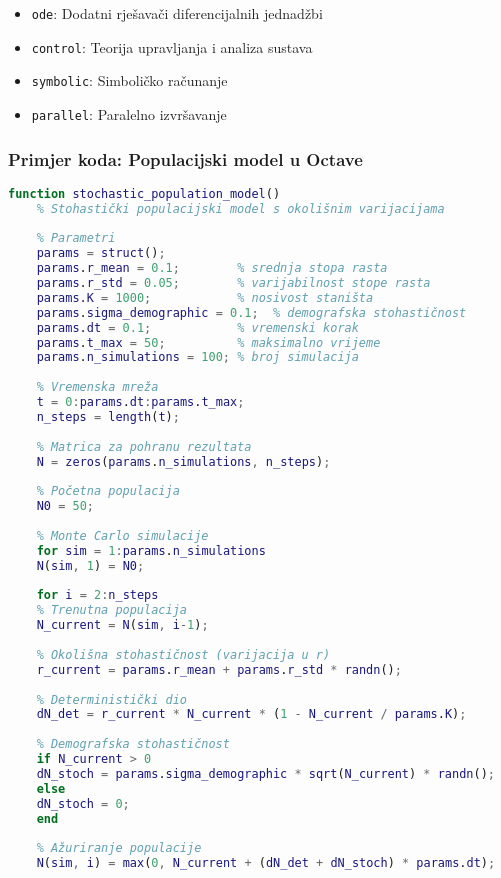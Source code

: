 \documentclass[11pt,oneside]{book}
\begin{document}
\begin{itemize}
	\item \texttt{ode}: Dodatni rješavači diferencijalnih jednadžbi
	\item \texttt{control}: Teorija upravljanja i analiza sustava
	\item \texttt{symbolic}: Simboličko računanje
	\item \texttt{parallel}: Paralelno izvršavanje
\end{itemize}

\subsubsection{Primjer koda: Populacijski model u Octave}

\begin{lstlisting}[language=Matlab, caption=Stohastički populacijski model u Octave]
	function stochastic_population_model()
	% Stohastički populacijski model s okolišnim varijacijama
	
	% Parametri
	params = struct();
	params.r_mean = 0.1;        % srednja stopa rasta
	params.r_std = 0.05;        % varijabilnost stope rasta
	params.K = 1000;            % nosivost staništa
	params.sigma_demographic = 0.1;  % demografska stohastičnost
	params.dt = 0.1;            % vremenski korak
	params.t_max = 50;          % maksimalno vrijeme
	params.n_simulations = 100; % broj simulacija
	
	% Vremenska mreža
	t = 0:params.dt:params.t_max;
	n_steps = length(t);
	
	% Matrica za pohranu rezultata
	N = zeros(params.n_simulations, n_steps);
	
	% Početna populacija
	N0 = 50;
	
	% Monte Carlo simulacije
	for sim = 1:params.n_simulations
	N(sim, 1) = N0;
	
	for i = 2:n_steps
	% Trenutna populacija
	N_current = N(sim, i-1);
	
	% Okolišna stohastičnost (varijacija u r)
	r_current = params.r_mean + params.r_std * randn();
	
	% Deterministički dio
	dN_det = r_current * N_current * (1 - N_current / params.K);
	
	% Demografska stohastičnost
	if N_current > 0
	dN_stoch = params.sigma_demographic * sqrt(N_current) * randn();
	else
	dN_stoch = 0;
	end
	
	% Ažuriranje populacije
	N(sim, i) = max(0, N_current + (dN_det + dN_stoch) * params.dt);
	

\end{lstlisting}
\end{document}
